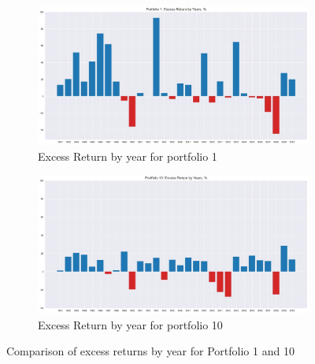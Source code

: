 \documentclass[11pt]{article}
\begin{document}
\begin{figure}[H]
    \centering
    \begin{subfigure}[b]{0.5\textwidth}
        \centering
        \includegraphics[width=\textwidth]{ex_ret_by_years1.jpg}
        \caption{Excess Return by year for portfolio 1}
        \label{fig:ex_ret_by_years1}
    \end{subfigure}
    \hfill
    \begin{subfigure}[b]{0.5\textwidth}
        \centering
        \includegraphics[width=\textwidth]{ex_ret_by_years10.jpg}
        \caption{Excess Return by year for portfolio 10}
        \label{fig:ex_ret_by_years10}
    \end{subfigure}
    \caption{Comparison of excess returns by year for Portfolio 1 and 10}
\end{figure}


\end{document}
